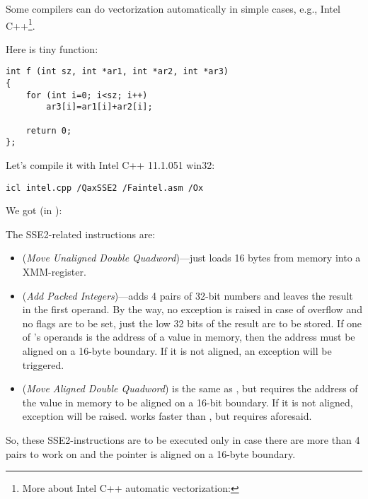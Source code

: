 
Some compilers can do vectorization automatically in simple cases, 
e.g., Intel C++\footnote{More about Intel C++ automatic vectorization: \URLINTELVEC}.

Here is tiny function:

\begin{lstlisting}[style=customc]
int f (int sz, int *ar1, int *ar2, int *ar3)
{
	for (int i=0; i<sz; i++)
		ar3[i]=ar1[i]+ar2[i];

	return 0;
};
\end{lstlisting}


Let's compile it with Intel C++ 11.1.051 win32:

\begin{verbatim}
icl intel.cpp /QaxSSE2 /Faintel.asm /Ox
\end{verbatim}

We got (in \IDA):



The SSE2-related instructions are:
\begin{itemize}
\item
\MOVDQU (\emph{Move Unaligned Double Quadword})---just loads 16 bytes from memory into a XMM-register.

\item
\PADDD (\emph{Add Packed Integers})---adds 4 pairs of 32-bit numbers and leaves the result in the first operand.
By the way, no exception is raised in case of overflow and no flags are to be set, 
just the low 32 bits of the result are to be stored.
If one of \PADDD's operands is the address of a value in memory,
then the address must be aligned on a 16-byte boundary. 
If it is not aligned, an exception will be triggered.

\item
\MOVDQA (\emph{Move Aligned Double Quadword})
is the same as \MOVDQU, but requires the address of the value in memory to be aligned on a 16-bit boundary.
If it is not aligned, exception will be raised.
\MOVDQA works faster than \MOVDQU, but requires aforesaid.

\end{itemize}

So, these SSE2-instructions are to be executed only in case there are more than 4 pairs to work on
and the pointer  is aligned on a 16-byte boundary.

